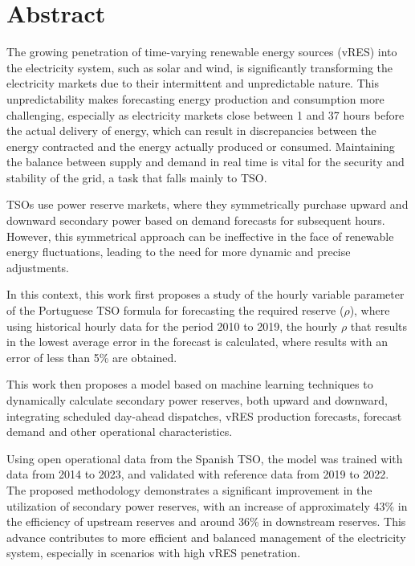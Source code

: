 \chapter{Abstract}
\justifying

The growing penetration of time-varying renewable energy sources (\gls{vRES}) into the electricity system, such as solar and wind, is significantly transforming the electricity markets due to their intermittent and unpredictable nature. This unpredictability makes forecasting energy production and consumption more challenging, especially as electricity markets close between 1 and 37 hours before the actual delivery of energy, which can result in discrepancies between the energy contracted and the energy actually produced or consumed. Maintaining the balance between supply and demand in real time is vital for the security and stability of the grid, a task that falls mainly to \gls{TSO}.\par
TSOs use power reserve markets, where they symmetrically purchase upward and downward secondary power based on demand forecasts for subsequent hours. However, this symmetrical approach can be ineffective in the face of renewable energy fluctuations, leading to the need for more dynamic and precise adjustments.\par
In this context, this work first proposes a study of the hourly variable parameter of the Portuguese \gls{TSO} formula for forecasting the required reserve ($\rho$), where using historical hourly data for the period 2010 to 2019, the hourly $\rho$ that results in the lowest average error in the forecast is calculated, where results with an error of less than 5\% are obtained.\par
This work then proposes a model based on machine learning techniques to dynamically calculate secondary power reserves, both upward and downward, integrating scheduled day-ahead dispatches, \gls{vRES} production forecasts, forecast demand and other operational characteristics.\par
Using open operational data from the Spanish \gls{TSO}, the model was trained with data from 2014 to 2023, and validated with reference data from 2019 to 2022. The proposed methodology demonstrates a significant improvement in the utilization of secondary power reserves, with an increase of approximately 43\% in the efficiency of upstream reserves and around 36\% in downstream reserves. This advance contributes to more efficient and balanced management of the electricity system, especially in scenarios with high \gls{vRES} penetration.\par


\vspace{0.5cm} %

